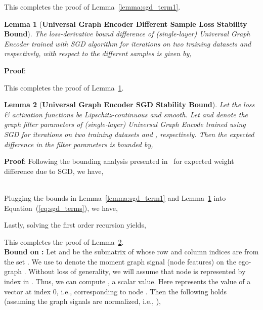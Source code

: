 \documentclass{article}
\newtheorem{lemma}{Lemma}
\begin{document}
This completes the proof of Lemma~\ref{lemma:sgd_term1}. \\

\begin{lemma}[\textbf{Universal Graph Encoder    Different Sample Loss Stability Bound}]\label{lemma:sgd_term2}
	\textit{The   loss-derivative bound difference   of (single-layer) Universal Graph Encoder     trained with SGD algorithm for  iterations on two training datasets  and  respectively,  with respect to  the  different samples     is given by,}
	
\end{lemma}
\noindent \textbf{Proof}: 



This completes the proof of Lemma~\ref{lemma:sgd_term2}. \\


\begin{lemma}[\textbf{Universal Graph Encoder    SGD Stability Bound}]\label{lemma:sgd_terms} \textit{ Let the loss \& activation functions be  Lipschitz-continuous and smooth. Let  and  denote the graph filter parameters of (single-layer)  Universal Graph Encode	 trained using SGD for  iterations on two training datasets   and , respectively. Then the expected difference in   the filter  parameters  is bounded by,}
	
\end{lemma}
\noindent \textbf{Proof}: Following the bounding analysis presented in~\cite{verma2019stability} for expected weight difference due to SGD, we have,


 \\


Plugging the bounds in	Lemma~\ref{lemma:sgd_term1} and Lemma~\ref{lemma:sgd_term2} into Equation~(\ref{eq:sgd_terms}),  we have,


Lastly,   solving the  first order recursion yields, 

This completes the proof of Lemma~\ref{lemma:sgd_terms}. \\

\noindent \textbf{Bound on : }   Let    and  be the submatrix of   whose row and column indices are from the set .  We use  to denote the  moment graph signal  (node features) on the ego-graph .  Without loss of generality, we will assume that node  is represented by index  in   . Thus, we can compute , a scalar value. Here  represents the value of a vector at index 0, i.e., corresponding to  node . Then the following holds (assuming the graph signals are normalized, i.e., ),
\end{document}
